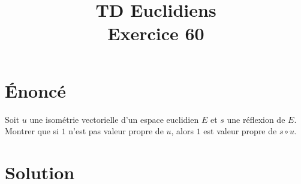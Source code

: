 \documentclass[french]{article}
\title{TD Euclidiens\\ Exercice 60}
\date{}
\begin{document}
\maketitle

\section{Énoncé}
Soit $u$ une isométrie vectorielle d'un espace euclidien $E$ et $s$ une réflexion de $E$. Montrer que si $1$ n'est pas valeur propre de $u$, alors $1$ est valeur propre de $s\circ u$.
\section{Solution}
\end{document}
